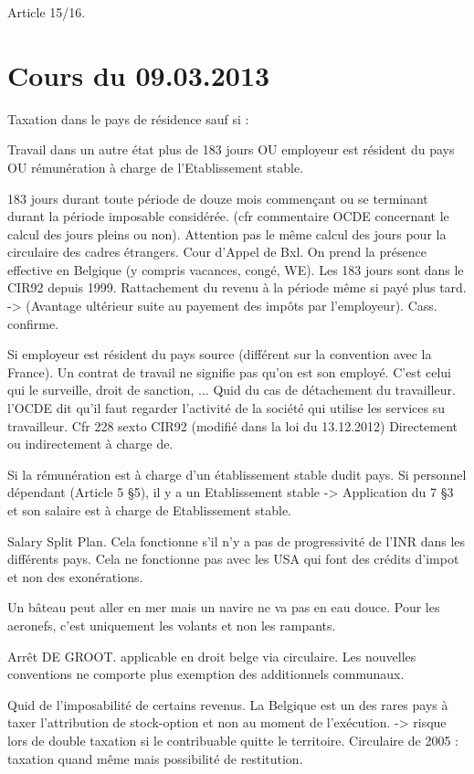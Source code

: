 \documentclass{book}
\begin{document}
Article 15/16.

\chapter{Cours du 09.03.2013}

Taxation dans le pays de résidence sauf si :

Travail dans un autre état plus de 183 jours OU employeur est résident du pays OU rémunération à charge de l'Etablissement stable.

183 jours durant toute période de douze mois commençant ou se terminant durant la période imposable considérée. (cfr commentaire OCDE concernant le calcul des jours pleins ou non). Attention pas le même calcul des jours pour la circulaire des cadres étrangers. Cour d'Appel de Bxl. On prend la présence effective en Belgique (y compris vacances, congé, WE). Les 183 jours sont dans le CIR92 depuis 1999. Rattachement du revenu à la période même si payé plus tard. -> (Avantage ultérieur suite au payement des impôts par l'employeur). Cass. confirme.

Si employeur est résident du pays source (différent sur la convention avec la France).	Un contrat de travail ne signifie pas qu'on est son employé. C'est celui qui le surveille, droit de sanction, ... Quid du cas de détachement du travailleur. l'OCDE dit qu'il faut regarder l'activité de la société qui utilise les services su travailleur. Cfr 228 sexto CIR92 (modifié dans la loi du 13.12.2012) Directement ou indirectement à charge de.	

Si la rémunération est à charge d'un établissement stable dudit pays. Si personnel dépendant (Article 5 §5), il y a un Etablissement stable -> Application du 7 §3 et son salaire est à charge de Etablissement stable.

Salary Split Plan. Cela fonctionne s'il n'y a pas de progressivité de l'INR dans les différents pays. Cela ne fonctionne pas avec les USA qui font des crédits d'impot et non des exonérations.

Un bâteau peut aller en mer mais un navire ne va pas en eau douce. Pour les aeronefs, c'est uniquement les volants et non les rampants.


Arrêt DE GROOT. applicable en droit belge via circulaire. Les nouvelles conventions ne comporte plus exemption des additionnels communaux.

Quid de l'imposabilité de certains revenus. La Belgique est un des rares pays à taxer l'attribution de stock-option et non au moment de l'exécution. -> risque lors de double taxation si le contribuable quitte le territoire. Circulaire de 2005 : taxation quand même mais possibilité de restitution.
\end{document}
